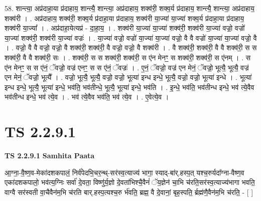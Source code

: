 \documentclass[17pt]{extarticle}
\begin{document}
58. शान्त्या॒ अप्र॑दाहा॒या प्र॑दाहाय॒ शान्त्यै॒ शान्त्या॒ अप्र॑दाहाय॒ शक्व॑री॒ शक्व॒र्य प्र॑दाहाय॒ शान्त्यै॒ शान्त्या॒ अप्र॑दाहाय॒ शक्व॑री । . अप्र॑दाहाय॒ शक्व॑री॒ शक्व॒र्य प्र॑दाहा॒या प्र॑दाहाय॒ शक्व॑री या॒ज्या॑ या॒ज्या॑ शक्व॒र्य प्र॑दाहा॒या प्र॑दाहाय॒ शक्व॑री या॒ज्या᳚ । . अप्र॑दाहा॒येत्यप्र॑ - दा॒हा॒य॒ । . शक्व॑री या॒ज्या॑ या॒ज्या॑ शक्व॑री॒ शक्व॑री या॒ज्या॑ वज्रो॒ वज्रो॑ या॒ज्या॑ शक्व॑री॒ शक्व॑री या॒ज्या॑ वज्रः॑ । . या॒ज्या॑ वज्रो॒ वज्रो॑ या॒ज्या॑ या॒ज्या॑ वज्रो॒ वै वै वज्रो॑ या॒ज्या॑ या॒ज्या॑ वज्रो॒ वै । . वज्रो॒ वै वै वज्रो॒ वज्रो॒ वै शक्व॑री॒ शक्व॑री॒ वै वज्रो॒ वज्रो॒ वै शक्व॑री । . वै शक्व॑री॒ शक्व॑री॒ वै वै शक्व॑री॒ स स शक्व॑री॒ वै वै शक्व॑री॒ सः । . शक्व॑री॒ स स शक्व॑री॒ शक्व॑री॒ स ए॑न मेनꣳ॒॒ स शक्व॑री॒ शक्व॑री॒ स ए॑नम् । . स ए॑न मेनꣳ॒॒ स स ए॑नं॒ ॅवज्रो॒ वज्र॑ एनꣳ॒॒ स स ए॑नं॒ ॅवज्रः॑ । . ए॒नं॒ ॅवज्रो॒ वज्र॑ एन मेनं॒ ॅवज्रो॒ भूत्यै॒ भूत्यै॒ वज्र॑ एन मेनं॒ ॅवज्रो॒ भूत्यै᳚ । . वज्रो॒ भूत्यै॒ भूत्यै॒ वज्रो॒ वज्रो॒ भूत्या॑ इन्ध इन्धे॒ भूत्यै॒ वज्रो॒ वज्रो॒ भूत्या॑ इन्धे । . भूत्या॑ इन्ध इन्धे॒ भूत्यै॒ भूत्या॑ इन्धे॒ भव॑ति॒ भव॑तीन्धे॒ भूत्यै॒ भूत्या॑ इन्धे॒ भव॑ति । . इ॒न्धे॒ भव॑ति॒ भव॑तीन्ध इन्धे॒ भव॑ त्ये॒वैव भव॑तीन्ध इन्धे॒ भव॑ त्ये॒व । . भव॑ त्ये॒वैव भव॑ति॒ भव॑ त्ये॒व । . ए॒वेत्ये॒व । \newline
\pagebreak
{}

\section{ TS 2.2.9.1 }

\textbf{TS 2.2.9.1 } \newline
\textbf{Samhita Paata} \newline

आ॒ग्ना॒-वै॒ष्ण॒व-मेका॑दशकपालं॒ निर्व॑पेदभि॒चर॒न्थ्-सर॑स्व॒त्याज्य॑ भागा॒ स्याद्-बा॑र्.हस्प॒त् यश्च॒रुर्यदा᳚ग्ना-वैष्ण॒व एका॑दशकपालो॒ भव॑त्य॒ग्निः सर्वा॑ दे॒वता॒ विष्णु॑र्य॒ज्ञो दे॒वता॑भिश्चै॒वैनं॑ ॅय॒ज्ञेन॑ चा॒भि च॑रति॒सर॑स्व॒त्याज्य॑भागा भवति॒ वाग्वै सर॑स्वती वा॒चैवैन॑म॒भि च॑रति बार्.हस्प॒त्यश्च॒रु र्भ॑वति॒ ब्रह्म॒ वै दे॒वानां॒ बृह॒स्पति॒ र्ब्रह्म॑णै॒वैन॑म॒भि च॑रति॒ - [  ] \newline
\end{document}
